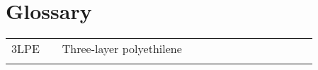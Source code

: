 \chapter*{Glossary}

\noindent
\begin{longtable}{l l p{0.86\linewidth}}

3LPE 	&   & Three-layer polyethilene \\\\

\end{longtable}

